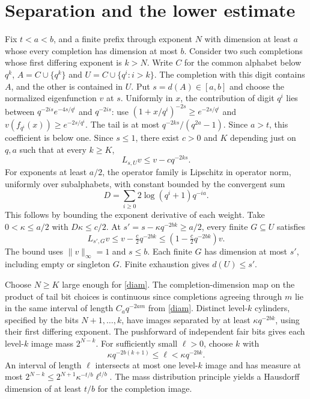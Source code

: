 \documentclass[11pt,a4paper]{amsart}
\begin{document}
\section{Separation and the lower estimate}
Fix $t<a<b$, and a finite prefix through exponent $N$ with dimension at least $a$ whose every completion has dimension at most $b$. Consider two such completions whose first differing exponent is $k>N$. Write $C$ for the common alphabet below $q^k$, $A=C\cup\{q^k\}$ and $U=C\cup\{q^i:i>k\}$. The completion with this digit contains $A$, and the other is contained in $U$. Put $s=d(A)\in[a,b]$ and choose the normalized eigenfunction $v$ at $s$. Uniformly in $x$, the contribution of digit $q^i$ lies between $q^{-2is}e^{-4s/q^i}$ and $q^{-2is}$: use $(1+x/q^i)^{-2s}\ge e^{-2s/q^i}$ and $v(f_{q^i}(x))\ge e^{-2s/q^i}$. The tail is at most $q^{-2ks}/(q^{2a}-1)$. Since $a>t$, this coefficient is below one. Since $s\le1$, there exist $c>0$ and $K$ depending just on $q,a$ such that at every $k\ge K$,
\[
L_{s,U}v\le v-cq^{-2ks}.
\]
For exponents at least $a/2$, the operator family is Lipschitz in operator norm, uniformly over subalphabets, with constant bounded by the convergent sum
\[
D=\sum_{i\ge0} 2\log(q^i+1)q^{-ia}.
\]
This follows by bounding the exponent derivative of each weight. Take $0<\kappa\le a/2$ with $D\kappa\le c/2$. At $s'=s-\kappa q^{-2bk}\ge a/2$, every finite $G\subseteq U$ satisfies
\[
L_{s',G}v\le v-\tfrac c2 q^{-2bk}\le(1-\tfrac c2 q^{-2bk})v.
\]
The bound uses $\|v\|_\infty=1$ and $s\le b$. Each finite $G$ has dimension at most $s'$, including empty or singleton $G$. Finite exhaustion gives $d(U)\le s'$.

Choose $N\ge K$ large enough for \eqref{diam}. The completion-dimension map on the product of tail bit choices is continuous since completions agreeing through $m$ lie in the same interval of length $C_a q^{-2am}$ from \eqref{diam}. Distinct level-$k$ cylinders, specified by the bits $N+1,\ldots,k$, have images separated by at least $\kappa q^{-2bk}$, using their first differing exponent. The pushforward of independent fair bits gives each level-$k$ image mass $2^{N-k}$. For sufficiently small $\ell>0$, choose $k$ with
\[
\kappa q^{-2b(k+1)}\le\ell<\kappa q^{-2bk}.
\]
An interval of length $\ell$ intersects at most one level-$k$ image and has measure at most $2^{N-k}\le 2^{N+1}\kappa^{-t/b}\ell^{t/b}$. The mass distribution principle yields a Hausdorff dimension of at least $t/b$ for the completion image.

\newpage
\end{document}
